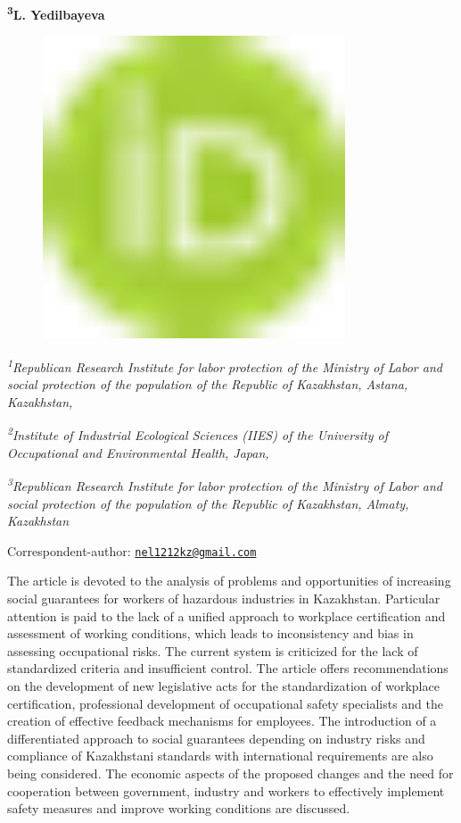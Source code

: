 {\bfseries \textsuperscript{3}L. Yedilbayeva}
\begin{figure}[H]
	\centering
	\includegraphics[width=0.8\textwidth]{media/gorn/image1}
	\caption*{}
\end{figure}


\emph{\textsuperscript{1}Republican Research Institute for labor
protection of the Ministry of Labor and social protection of the
population of the Republic of Kazakhstan, Astana, Kazakhstan,}

\emph{\textsuperscript{2}Institute of Industrial Ecological Sciences
(IIES) of the University of Occupational and Environmental Health,
Japan,}

\emph{\textsuperscript{3}Republican Research Institute for labor
protection of the Ministry of Labor and social protection of the
population of the Republic of Kazakhstan, Almaty, Kazakhstan}

Correspondent-author:
\href{mailto:nel1212kz@gmail.com}{\nolinkurl{nel1212kz@gmail.com}}

The article is devoted to the analysis of problems and opportunities of
increasing social guarantees for workers of hazardous industries in
Kazakhstan. Particular attention is paid to the lack of a unified
approach to workplace certification and assessment of working
conditions, which leads to inconsistency and bias in assessing
occupational risks. The current system is criticized for the lack of
standardized criteria and insufficient control. The article offers
recommendations on the development of new legislative acts for the
standardization of workplace certification, professional development of
occupational safety specialists and the creation of effective feedback
mechanisms for employees. The introduction of a differentiated approach
to social guarantees depending on industry risks and compliance of
Kazakhstani standards with international requirements are also being
considered. The economic aspects of the proposed changes and the need
for cooperation between government, industry and workers to effectively
implement safety measures and improve working conditions are discussed.

